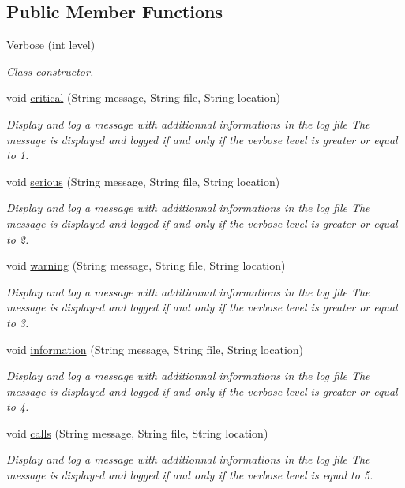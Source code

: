 \subsection*{Public Member Functions}
\begin{DoxyCompactItemize}
\item 
\hyperlink{classdebug_1_1_verbose_a91cd6412ba96325ae848b77964096ee1}{Verbose} (int level)
\begin{DoxyCompactList}\small\item\em Class constructor. \end{DoxyCompactList}\item 
void \hyperlink{classdebug_1_1_verbose_a53cf9993db806e1915527c19db3ee5ba}{critical} (String message, String file, String location)
\begin{DoxyCompactList}\small\item\em Display and log a message with additionnal informations in the log file The message is displayed and logged if and only if the verbose level is greater or equal to 1. \end{DoxyCompactList}\item 
void \hyperlink{classdebug_1_1_verbose_a10446bebb3cca58e71c4355b74fff49a}{serious} (String message, String file, String location)
\begin{DoxyCompactList}\small\item\em Display and log a message with additionnal informations in the log file The message is displayed and logged if and only if the verbose level is greater or equal to 2. \end{DoxyCompactList}\item 
void \hyperlink{classdebug_1_1_verbose_a178f9afaeb03db850592a967ab911dee}{warning} (String message, String file, String location)
\begin{DoxyCompactList}\small\item\em Display and log a message with additionnal informations in the log file The message is displayed and logged if and only if the verbose level is greater or equal to 3. \end{DoxyCompactList}\item 
void \hyperlink{classdebug_1_1_verbose_ab253e41af1fcaf03a062d0586aef7a6e}{information} (String message, String file, String location)
\begin{DoxyCompactList}\small\item\em Display and log a message with additionnal informations in the log file The message is displayed and logged if and only if the verbose level is greater or equal to 4. \end{DoxyCompactList}\item 
void \hyperlink{classdebug_1_1_verbose_ad0eb6503e6bd79e28ae29106f23742ff}{calls} (String message, String file, String location)
\begin{DoxyCompactList}\small\item\em Display and log a message with additionnal informations in the log file The message is displayed and logged if and only if the verbose level is equal to 5. \end{DoxyCompactList}\end{DoxyCompactItemize}
